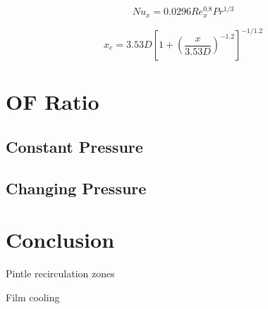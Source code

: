 \documentclass[11pt]{article}
\begin{document}
\begin{equation}
  Nu_x = 0.0296 Re_x^{0.8} Pr^{1/3}
\end{equation}

\begin{equation}
  x_e = 3.53D \left[ 1 + \left( \frac{x}{3.53D} \right)^{-1.2}\right]^{-1/1.2}
\end{equation}

\section{OF Ratio}

\subsection{Constant Pressure}

\subsection{Changing Pressure}

\section{Conclusion}

Pintle recirculation zones

Film cooling
\end{document}
